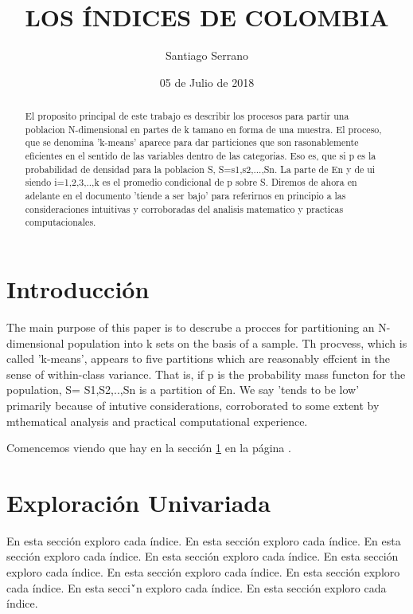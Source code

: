 \documentclass{article}
\title{LOS \'INDICES DE COLOMBIA}
\author[1]{\normalsize Santiago Serrano}
\affil[1,2]{\small  Escuela de Ingenier\'ia,Universidad de los Andes\\
\texttt{{s.serrano11}@uniandes.edu.col}}
\affil[1]{\small Instituto de altas investigaciones financieras\\
Banco del Parque\\
\texttt{delcurso@bp.com.col}}
\date{05 de Julio de 2018}
\begin{document}


\maketitle



\begin{abstract}
El proposito principal de este trabajo es describir los procesos para partir una poblacion N-dimensional en partes de k tamano en forma de una muestra. El proceso, que se denomina 'k-means' aparece para dar particiones que son rasonablemente eficientes en el sentido de las variables dentro de las categorias. Eso es, que si p es la probabilidad de densidad para la poblacion S, S=s1,s2,...,Sn. La parte de En y de ui siendo i=1,2,3,..,k es el promedio condicional de p sobre S. Diremos de ahora en adelante en el documento 'tiende a ser bajo' para referirnos en principio a las consideraciones intuitivas y corroboradas del analisis matematico y practicas computacionales.
\end{abstract}

\section*{Introducci\'on}

The main purpose of this paper is to descrube a procces for partitioning an N-dimensional population into k sets on the basis of a sample. Th procvess, which is called 'k-means', appears to five partitions which are reasonably effcient in the sense of within-class variance. That is, if p is the probability mass functon for the population, S= S1,S2,..,Sn is a partition of En. We say 'tends to be low' primarily because of intutive considerations, corroborated to some extent by mthematical analysis and practical computational experience.


Comencemos viendo que hay en la secci\'on \ref{univariada} en la p\'agina \pageref{univariada}.

\clearpage



\section{Exploraci\'on Univariada}\label{univariada}

En esta secci\'on exploro cada \'indice. En esta secci\'on exploro cada \'indice. En esta secci\'on exploro cada \'indice. En esta secci\'on exploro cada \'indice. En esta secci\'on exploro cada \'indice. En esta secci\'on exploro cada \'indice. En esta secci\'on exploro cada \'indice. En esta secci\'`n exploro cada \'indice. En esta secci\'on exploro cada \'indice.
\end{document}
